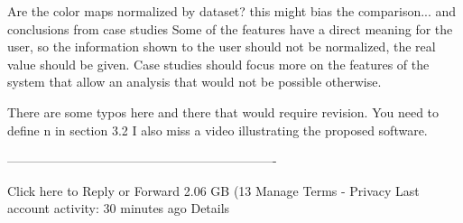     Are the color maps normalized by dataset? this might bias the comparison... and
    conclusions from case studies
    Some of the features have a direct meaning for the user, so the information shown
    to the user should not be normalized, the real value should be given.
    Case studies should focus more on the features of the system that allow an
    analysis that would not be possible otherwise.

    There are some typos here and there that would require revision.
    You need to define n in section 3.2
    I also miss a video illustrating the proposed software.

----------------------------------------------------------------


	
Click here to Reply or Forward
2.06 GB (13%
Manage
Terms - Privacy
Last account activity: 30 minutes ago
Details

